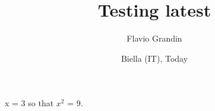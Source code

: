 \documentclass{article}
\title{Testing latest}
\author{Flavio Grandin}
\date{Biella (IT), Today}
\begin{document}
x = 3 so that $x^2$ = 9.
\end{document}
